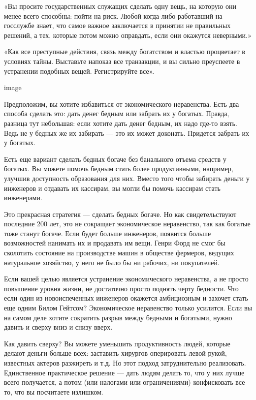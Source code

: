 \documentclass[ebook,12pt,oneside,openany]{memoir}
\begin{document}
\maketitle

«Вы просите государственных служащих сделать одну вещь, на которую они
менее всего способны: пойти на риск. Любой когда-либо работавший на
госслужбе знает, что самое важное заключается в принятии не правильных
решений, а тех, которые потом можно оправдать, если они окажутся
неверными.»

«Как все преступные действия, связь между богатством и властью
процветает в условиях тайны. Выставьте напоказ все транзакции, и вы
сильно преуспеете в устранении подобных вещей. Регистрируйте все».

image

Предположим, вы хотите избавиться от экономического неравенства. Есть
два способа сделать это: дать денег бедным или забрать их у богатых.
Правда, разница тут небольшая: если хотите дать денег бедным, их надо
где-то взять. Ведь не у бедных же их забирать — это их может доконать.
Придется забрать их у богатых.

Есть еще вариант сделать бедных богаче без банального отъема средств у
богатых. Вы можете помочь бедным стать более продуктивными, например,
улучшив доступность образования для них. Вместо того чтобы забирать
деньги у инженеров и отдавать их кассирам, вы могли бы помочь кассирам
стать инженерами.

Это прекрасная стратегия — сделать бедных богаче. Но как
свидетельствуют последние 200 лет, это не сокращает экономическое
неравенство, так как богатые тоже станут богаче. Если будет больше
инженеров, появится больше возможностей нанимать их и продавать им
вещи. Генри Форд не смог бы сколотить состояние на производстве машин
в обществе фермеров, ведущих натуральное хозяйство, у него не было бы
ни рабочих, ни покупателей.


Если вашей целью является устранение экономического неравенства, а не
просто повышение уровня жизни, не достаточно просто поднять черту
бедности. Что если один из новоиспеченных инженеров окажется
амбициозным и захочет стать еще одним Билом Гейтсом? Экономическое
неравенство только усилится. Если вы на самом деле хотите сократить
разрыв между бедными и богатыми, нужно давить и сверху вниз и снизу
вверх.

Как давить сверху? Вы можете уменьшить продуктивность людей, которые
делают деньги больше всех: заставить хирургов оперировать левой рукой,
известных актеров разжиреть и т.д. Но этот подход затруднительно
реализовать. Единственное практическое решение — дать людям делать то,
что у них лучше всего получается, а потом (или налогами или
ограничениями) конфисковать все то, что вы посчитаете излишком.
\end{document}

